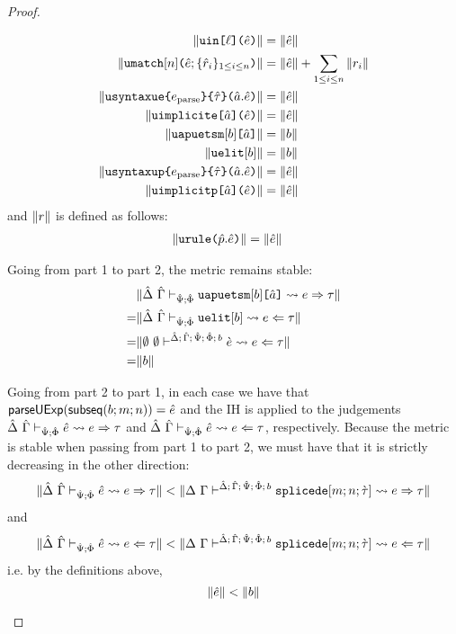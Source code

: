 \begin{proof}
\begin{itemize}
\begin{align*}
\Vert \texttt{uin}\texttt{[}\ell\texttt{](}{\hat e}\texttt{)} \Vert & = \Vert {\hat e} \Vert\\
\Vert \texttt{umatch}[n]\texttt{(}{\hat e}; \{\hat{r}_{i}\}_{1 \leq i \leq n}\texttt{)} \Vert & = \Vert {\hat e} \Vert + \sum_{1 \leq i \leq n} \Vert r_i \Vert\\
\Vert \texttt{usyntaxue}\texttt{\{}e_\text{parse}\texttt{\}\{}{\hat\tau}\texttt{\}(}\hat{a}.{\hat e}\texttt{)} \Vert & = \Vert {\hat e} \Vert\\
\Vert \texttt{uimplicite}\texttt{[}\hat{a}\texttt{](}{\hat e}\texttt{)} \Vert & = \Vert {\hat e} \Vert\\
\Vert \texttt{uapuetsm}[b]\texttt{[}\hat{a}\texttt{]} \Vert & = \Vert b \Vert\\
\Vert \texttt{uelit}[b] \Vert & = \Vert b \Vert\\
\Vert \texttt{usyntaxup}\texttt{\{}e_\text{parse}\texttt{\}\{}{\hat\tau}\texttt{\}(}\hat{a}.{\hat e}\texttt{)} \Vert & = \Vert {\hat e} \Vert\\
\Vert \texttt{uimplicitp}\texttt{[}\hat{a}\texttt{](}{\hat e}\texttt{)} \Vert & = \Vert {\hat e} \Vert
\end{align*}
and $\Vert r \Vert$ is defined as follows:
\begin{align*}
\Vert \texttt{urule}\texttt{(}\hat{p}.{\hat e}\texttt{)} \Vert & = \Vert {\hat e} \Vert
\end{align*}

Going from part 1 to part 2, the metric remains stable:
\begin{align*}
 & \Vert \hat{\Delta}~\hat{\Gamma} \vdash_{\hat{\Psi}; \hat\Phi} \texttt{uapuetsm}[b]\texttt{[}\hat{a}\texttt{]} \leadsto e \Rightarrow \tau \Vert\\
=& \Vert \hat{\Delta}~\hat{\Gamma} \vdash_{\hat{\Psi}; \hat\Phi} \texttt{uelit}[b] \leadsto e \Leftarrow \tau \Vert\\
=& \Vert \emptyset~\emptyset \vdash^{\hat{\Delta};\,\hat{\Gamma};\,\hat{\Psi};\,\hat\Phi;\,b} \grave{e} \leadsto e \Leftarrow \tau \Vert\\
=&\Vert b \Vert\end{align*}

Going from part 2 to part 1, in each case we have that $\mathsf{parseUExp}(\mathsf{subseq}(b; m; n))={\hat e}$ and the IH is applied to the judgements $\hat{\Delta}~\hat{\Gamma} \vdash_{\hat{\Psi}; \hat\Phi} {\hat e} \leadsto e \Rightarrow \tau$ and $\hat{\Delta}~\hat{\Gamma} \vdash_{\hat{\Psi}; \hat\Phi} {\hat e} \leadsto e \Leftarrow \tau$, respectively. Because the metric is stable when passing from part 1 to part 2, we must have that it is strictly decreasing in the other direction:
\[\Vert \hat{\Delta}~\hat{\Gamma} \vdash_{\hat{\Psi}; \hat\Phi} {\hat e} \leadsto e \Rightarrow \tau \Vert < \Vert \Delta~\Gamma \vdash^{\hat{\Delta};\,\hat{\Gamma};\,\hat{\Psi};\,\hat\Phi;\,b} \texttt{splicede}[m; n; \grave{\tau}] \leadsto e \Rightarrow \tau \Vert\]
and
\[\Vert \hat{\Delta}~\hat{\Gamma} \vdash_{\hat{\Psi}; \hat\Phi} {\hat e} \leadsto e \Leftarrow \tau \Vert < \Vert \Delta~\Gamma \vdash^{\hat{\Delta};\,\hat{\Gamma};\,\hat{\Psi};\,\hat\Phi;\,b} \texttt{splicede}[m; n; \grave{\tau}] \leadsto e \Leftarrow \tau \Vert\]
i.e. by the definitions above, 
\[\Vert {\hat e} \Vert < \Vert b \Vert\]


\end{itemize}
\end{proof}
